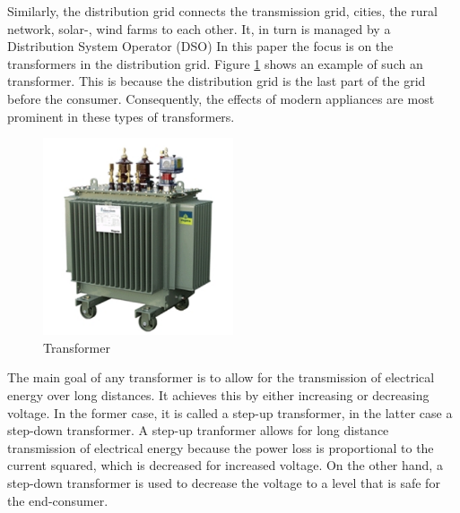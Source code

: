 Similarly, the distribution grid connects the transmission grid, cities, the rural network, solar-, wind farms to each other. It, in turn is managed by a Distribution System Operator (DSO)
In this paper the focus is on the transformers in the distribution grid. Figure \ref{fig:transformer} shows an example of such an transformer. This is because the distribution grid is the last part of the grid before the consumer. 
Consequently, the effects of modern appliances are most prominent in these types of transformers.
\begin{figure}[H]
    \centering
    \includegraphics[width=0.5\textwidth]{img/transformer.png}
    \caption{Transformer}
    \label{fig:transformer}
\end{figure}
The main goal of any transformer is to allow for the transmission of electrical energy over long distances. 
It achieves this by either increasing or decreasing voltage. In the former case, it is called a step-up transformer, in the latter case a step-down transformer.
A step-up tranformer allows for long distance transmission of electrical energy because the power loss is proportional to the current squared, which is decreased for increased voltage.
On the other hand, a step-down transformer is used to decrease the voltage to a level that is safe for the end-consumer.

